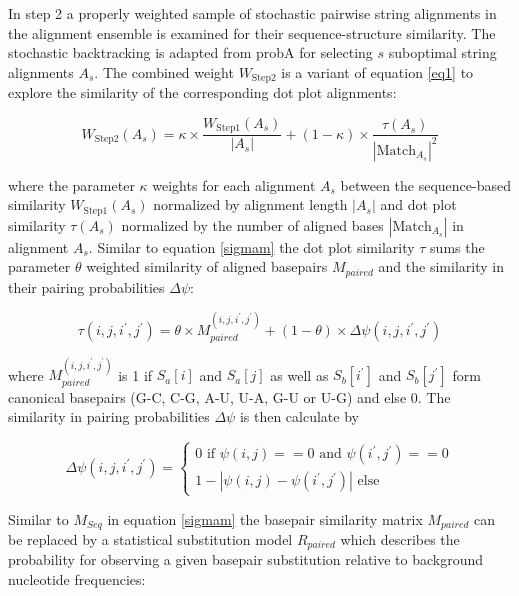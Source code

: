 \documentclass[a4paper,twoside]{article}
\begin{document}
In step 2 a properly weighted sample of stochastic pairwise string alignments
in the alignment ensemble is examined for their sequence-structure similarity.
The stochastic backtracking is adapted from probA \cite{Muckstein12385998} for
selecting $s$ suboptimal string alignments $A_s$.  The combined weight
$W_{\mbox{Step2}}$ is a variant of equation \ref{eq1} to explore the similarity
of the corresponding dot plot alignments:

\begin{equation}\label{eq7}
	W_{\mbox{Step2}}(A_s) = \kappa \times \frac{W_{\mbox{Step1}}(A_s)}{|A_s|} + (1-\kappa) \times
	\frac{\tau(A_s)}{{|\mbox{Match}_{A_s}|}^2}
\end{equation}

where the parameter $\kappa$ weights for each alignment $A_s$ between the
sequence-based similarity $W_{\mbox{Step1}}(A_s)$ normalized by alignment
length $|A_s|$ and dot plot similarity $\tau(A_s)$ normalized by the number of
aligned bases $|\mbox{Match}_{A_s}|$ in alignment $A_s$. Similar to equation
\ref{sigmam} the dot plot similarity $\tau$ sums the parameter $\theta$ weighted
similarity of aligned basepairs $M_{paired}$ and the similarity in their
pairing probabilities $\Delta \psi$:

\begin{equation}\label{eq8}
	\tau(i,j,i^\prime,j^\prime) = \theta \times M_{paired}^{(i,j,i^\prime,j^\prime)}
	+ (1-\theta) \times \Delta \psi(i,j,i^\prime,j^\prime)
\end{equation}

where $M_{paired}^{(i,j,i^\prime,j^\prime)}$ is 1 if $S_a[i]$ and $S_a[j]$ as
well as $S_b[i^\prime]$ and $S_b[j^\prime]$ form canonical basepairs (G-C, C-G,
A-U, U-A, G-U or U-G) and else 0. The similarity in pairing probabilities
$\Delta \psi$ is then calculate by

\begin{equation}\label{eq9}
	\Delta \psi(i,j,i^\prime,j^\prime) = \left\{ \begin{array}{l}
			0 \textrm{ if }\psi(i,j) == 0 
			  \textrm{ and }\psi(i^\prime,j^\prime) == 0 \\
		1 - | \psi(i,j) - \psi(i^\prime,j^\prime) | \textrm{ else}
		\end{array}\right.
\end{equation}

Similar to $M_{Seq}$ in equation \ref{sigmam} the basepair similarity matrix
$M_{paired}$ can be replaced by a statistical substitution model $R_{paired}$
which describes the probability for observing a given basepair substitution
relative to background nucleotide frequencies:
\end{document}
